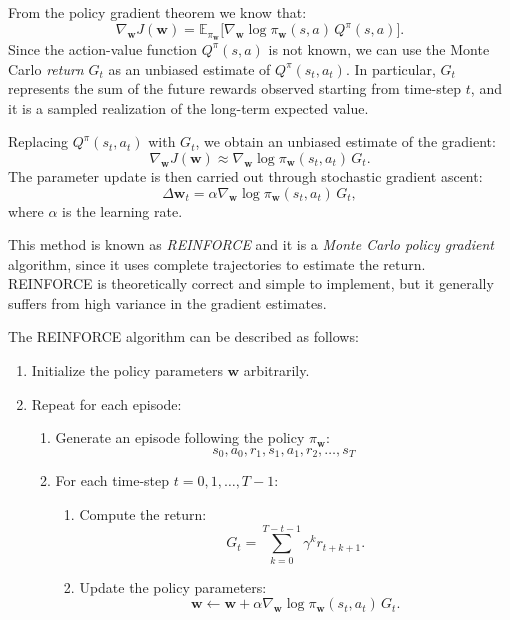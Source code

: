 From the policy gradient theorem we know that:
\[
\nabla_{\mathbf{w}} J(\mathbf{w})
= \mathbb{E}_{\pi_{\mathbf{w}}}\big[\nabla_{\mathbf{w}} \log \pi_{\mathbf{w}}(s,a)\, Q^{\pi}(s,a)\big].
\]
Since the action-value function $Q^{\pi}(s,a)$ is not known, we can use the Monte Carlo \emph{return} $G_t$ as an unbiased estimate of $Q^{\pi}(s_t,a_t)$. In particular, $G_t$ represents the sum of the future rewards observed starting from time-step $t$, and it is a sampled realization of the long-term expected value.

Replacing $Q^{\pi}(s_t,a_t)$ with $G_t$, we obtain an unbiased estimate of the gradient:
\[
\nabla_{\mathbf{w}} J(\mathbf{w})
\approx
\nabla_{\mathbf{w}} \log \pi_{\mathbf{w}}(s_t,a_t)\, G_t.
\]
The parameter update is then carried out through stochastic gradient ascent:
\[
\Delta \mathbf{w}_t
= \alpha \nabla_{\mathbf{w}} \log \pi_{\mathbf{w}}(s_t,a_t)\, G_t,
\]
where $\alpha$ is the learning rate.

This method is known as \emph{REINFORCE} and it is a \emph{Monte Carlo policy gradient} algorithm, since it uses complete trajectories to estimate the return. REINFORCE is theoretically correct and simple to implement, but it generally suffers from high variance in the gradient estimates.

The REINFORCE algorithm can be described as follows:

\begin{enumerate}
    \item Initialize the policy parameters $\mathbf{w}$ arbitrarily.
    \item Repeat for each episode:
    \begin{enumerate}
        \item Generate an episode following the policy $\pi_{\mathbf{w}}$:
        \[
        s_0, a_0, r_1, s_1, a_1, r_2, \dots, s_T
        \]
        \item For each time-step $t = 0,1,\dots,T-1$:
        \begin{enumerate}
            \item Compute the return:
            \[
            G_t = \sum_{k=0}^{T-t-1} \gamma^k r_{t+k+1}.
            \]
            \item Update the policy parameters:
            \[
            \mathbf{w} \leftarrow \mathbf{w}
            + \alpha \nabla_{\mathbf{w}} \log \pi_{\mathbf{w}}(s_t,a_t)\, G_t.
            \]
        \end{enumerate}
    \end{enumerate}
\end{enumerate}

